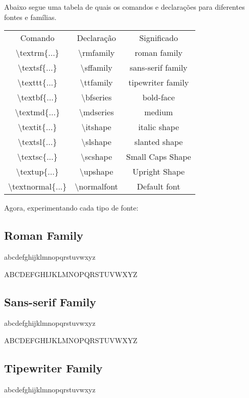 Abaixo segue uma tabela de quais os comandos e declarações para diferentes fontes e famílias.

\begin{center}
\begin{tabular}{ c c c }
Comando & Declaração & Significado \\
\textbackslash textrm\{...\}&\textbackslash rmfamily&roman family\\
\textbackslash textsf\{...\}&\textbackslash sffamily&sans-serif family\\
\textbackslash texttt\{...\}&\textbackslash ttfamily&tipewriter family\\
\textbackslash textbf\{...\}&\textbackslash bfseries&bold-face\\
\textbackslash textmd\{...\}&\textbackslash mdseries&medium\\
\textbackslash textit\{...\}&\textbackslash itshape&italic shape\\
\textbackslash textsl\{...\}&\textbackslash slshape&slanted shape\\
\textbackslash textsc\{...\}&\textbackslash scshape&Small Caps Shape\\
\textbackslash textup\{...\}&\textbackslash upshape&Upright Shape\\
\textbackslash textnormal\{...\} & \textbackslash normalfont & Default font\\
\end{tabular}
\end{center}

\vspace{10pt}

Agora, experimentando cada tipo de fonte:

\subsection{Roman Family}
\textrm{abcdefghijklmnopqrstuvwxyz}

\textrm{ABCDEFGHIJKLMNOPQRSTUVWXYZ}

\subsection{Sans-serif Family}
\textsf{abcdefghijklmnopqrstuvwxyz}

\textsf{ABCDEFGHIJKLMNOPQRSTUVWXYZ}

\subsection{Tipewriter Family}
\textrm{abcdefghijklmnopqrstuvwxyz}

